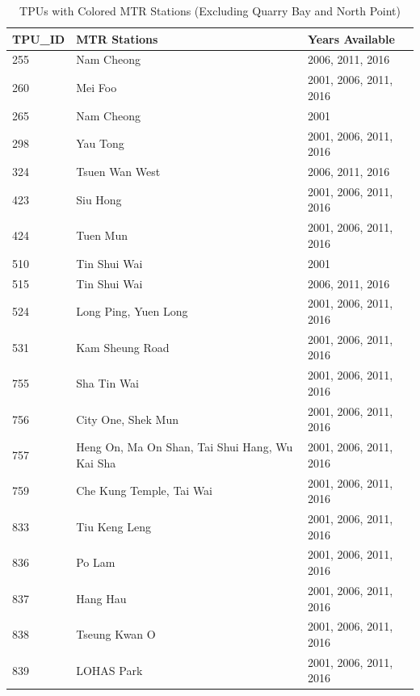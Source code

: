 
\begin{table}[h]
\centering
\caption{TPUs with Colored MTR Stations (Excluding Quarry Bay and North Point)}
\label{tab:tpu_colored_stations}
\begin{tabular}{p{2cm}p{6cm}p{4cm}}
\toprule
\textbf{TPU\_ID} & \textbf{MTR Stations} & \textbf{Years Available} \\
\midrule
255 & Nam Cheong & 2006, 2011, 2016 \\
260 & Mei Foo & 2001, 2006, 2011, 2016 \\
265 & Nam Cheong & 2001 \\
298 & Yau Tong & 2001, 2006, 2011, 2016 \\
324 & Tsuen Wan West & 2006, 2011, 2016 \\
423 & Siu Hong & 2001, 2006, 2011, 2016 \\
424 & Tuen Mun & 2001, 2006, 2011, 2016 \\
510 & Tin Shui Wai & 2001 \\
515 & Tin Shui Wai & 2006, 2011, 2016 \\
524 & Long Ping, Yuen Long & 2001, 2006, 2011, 2016 \\
531 & Kam Sheung Road & 2001, 2006, 2011, 2016 \\
755 & Sha Tin Wai & 2001, 2006, 2011, 2016 \\
756 & City One, Shek Mun & 2001, 2006, 2011, 2016 \\
757 & Heng On, Ma On Shan, Tai Shui Hang, Wu Kai Sha & 2001, 2006, 2011, 2016 \\
759 & Che Kung Temple, Tai Wai & 2001, 2006, 2011, 2016 \\
833 & Tiu Keng Leng & 2001, 2006, 2011, 2016 \\
836 & Po Lam & 2001, 2006, 2011, 2016 \\
837 & Hang Hau & 2001, 2006, 2011, 2016 \\
838 & Tseung Kwan O & 2001, 2006, 2011, 2016 \\
839 & LOHAS Park & 2001, 2006, 2011, 2016 \\
\bottomrule
\end{tabular}
\end{table}

